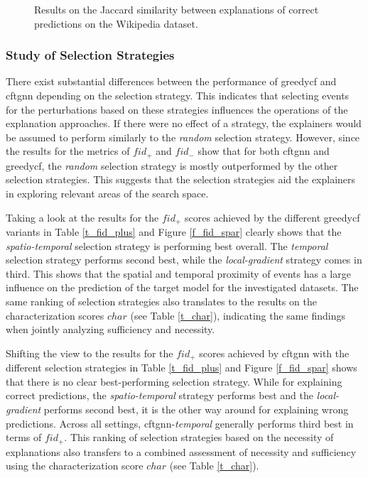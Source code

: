 \begin{figure}[ht]
    \centering
    
    \caption{Results on the Jaccard similarity between explanations of correct predictions on the Wikipedia dataset.}
    \label{f_jaccard_similarity_wiki}
\end{figure}


\FloatBarrier

\subsubsection{Study of Selection Strategies}
\label{s_Evaluation_Results_SelectionStrategies}

There exist substantial differences between the performance of \gls{greedycf} and \gls{cftgnn} depending on the selection strategy. This indicates that selecting events for the perturbations based on these strategies influences the operations of the explanation approaches. If there were no effect of a strategy, the explainers would be assumed to perform similarly to the \textit{random} selection strategy. However, since the results for the metrics of $fid_+$ and $fid_-$ show that for both \gls{cftgnn} and \gls{greedycf}, the \textit{random} selection strategy is mostly outperformed by the other selection strategies. This suggests that the selection strategies aid the explainers in exploring relevant areas of the search space.

Taking a look at the results for the $fid_+$ scores achieved by the different \gls{greedycf} variants in Table \ref{t_fid_plus} and Figure \ref{f_fid_spar} clearly shows that the \textit{spatio-temporal} selection strategy is performing best overall. The \textit{temporal} selection strategy performs second best, while the \textit{local-gradient} strategy comes in third. This shows that the spatial and temporal proximity of events has a large influence on the prediction of the target model for the investigated datasets. The same ranking of selection strategies also translates to the results on the characterization scores $char$ (see Table \ref{t_char}), indicating the same findings when jointly analyzing sufficiency and necessity.


Shifting the view to the results for the $fid_+$ scores achieved by \gls{cftgnn} with the different selection strategies in Table \ref{t_fid_plus} and Figure \ref{f_fid_spar} shows that there is no clear best-performing selection strategy. While for explaining correct predictions, the \textit{spatio-temporal} strategy performs best and the \textit{local-gradient} performs second best, it is the other way around for explaining wrong predictions. Across all settings, \gls{cftgnn}-\textit{temporal} generally performs third best in terms of $fid_+$. This ranking of selection strategies based on the necessity of explanations also transfers to a combined assessment of necessity and sufficiency using the characterization score $char$ (see Table \ref{t_char}).

